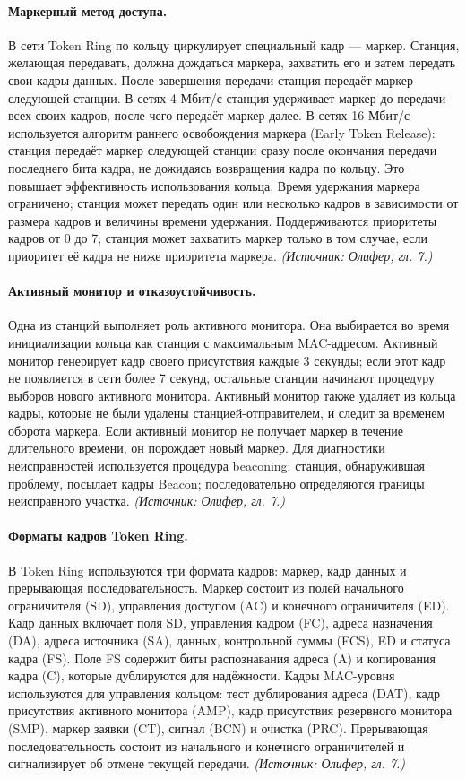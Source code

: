 \documentclass[a4paper,12pt]{article}
\begin{document}
\paragraph{Маркерный метод доступа.}
В сети Token Ring по кольцу циркулирует специальный кадр — маркер. Станция, желающая передавать, должна дождаться маркера, захватить его и затем передать свои кадры данных. После завершения передачи станция передаёт маркер следующей станции. В сетях 4 Мбит/с станция удерживает маркер до передачи всех своих кадров, после чего передаёт маркер далее. В сетях 16 Мбит/с используется алгоритм раннего освобождения маркера (Early Token Release): станция передаёт маркер следующей станции сразу после окончания передачи последнего бита кадра, не дожидаясь возвращения кадра по кольцу. Это повышает эффективность использования кольца. Время удержания маркера ограничено; станция может передать один или несколько кадров в зависимости от размера кадров и величины времени удержания. Поддерживаются приоритеты кадров от 0 до 7; станция может захватить маркер только в том случае, если приоритет её кадра не ниже приоритета маркера.
\textit{(Источник: Олифер, гл. 7.)}

\paragraph{Активный монитор и отказоустойчивость.}
Одна из станций выполняет роль активного монитора. Она выбирается во время инициализации кольца как станция с максимальным MAC-адресом. Активный монитор генерирует кадр своего присутствия каждые 3 секунды; если этот кадр не появляется в сети более 7 секунд, остальные станции начинают процедуру выборов нового активного монитора. Активный монитор также удаляет из кольца кадры, которые не были удалены станцией-отправителем, и следит за временем оборота маркера. Если активный монитор не получает маркер в течение длительного времени, он порождает новый маркер. Для диагностики неисправностей используется процедура beaconing: станция, обнаружившая проблему, посылает кадры Beacon; последовательно определяются границы неисправного участка.
\textit{(Источник: Олифер, гл. 7.)}

\paragraph{Форматы кадров Token Ring.}
В Token Ring используются три формата кадров: маркер, кадр данных и прерывающая последовательность. Маркер состоит из полей начального ограничителя (SD), управления доступом (AC) и конечного ограничителя (ED). Кадр данных включает поля SD, управления кадром (FC), адреса назначения (DA), адреса источника (SA), данных, контрольной суммы (FCS), ED и статуса кадра (FS). Поле FS содержит биты распознавания адреса (A) и копирования кадра (C), которые дублируются для надёжности. Кадры MAC-уровня используются для управления кольцом: тест дублирования адреса (DAT), кадр присутствия активного монитора (AMP), кадр присутствия резервного монитора (SMP), маркер заявки (CT), сигнал (BCN) и очистка (PRC). Прерывающая последовательность состоит из начального и конечного ограничителей и сигнализирует об отмене текущей передачи.
\textit{(Источник: Олифер, гл. 7.)}
\end{document}
